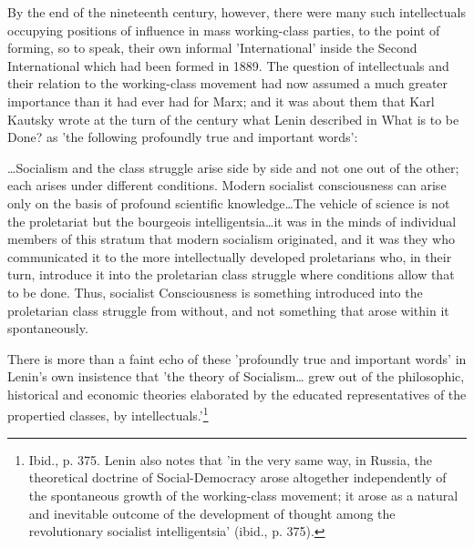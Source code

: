 By the end of the nineteenth century, however, there were many such intellectuals occupying positions of influence in mass working-class parties, to the point of forming, so to speak, their own informal 'International' inside the Second International which had been formed in 1889. The question of intellectuals and their relation to the working-class movement had now assumed a much greater importance than it had ever had for Marx; and it was about them that Karl Kautsky wrote at the turn of the century what Lenin described in What is to be Done? as 'the following profoundly true and important words':
\begin{displayquote}
    \dots Socialism and the class struggle arise side by side and not one out of the other; each arises under different conditions. Modern socialist consciousness can arise only on the basis of profound scientific knowledge\dots The vehicle of science is not the proletariat but the bourgeois intelligentsia\dots it was in the minds of individual members of this stratum that modern socialism originated, and it was they who communicated it to the more intellectually developed proletarians who, in their turn, introduce it into the proletarian class struggle where conditions allow that to be done. Thus, socialist Consciousness is something introduced into the proletarian class struggle from without, and not something that arose within it spontaneously.
\end{displayquote}

There is more than a faint echo of these 'profoundly true and important words' in Lenin's own insistence that 'the theory of Socialism\dots{} grew out of the philosophic, historical and economic theories elaborated by the educated representatives of the propertied classes, by intellectuals.'\footnote{Ibid., p. 375. Lenin also notes that 'in the very same way, in Russia, the theoretical doctrine of Social-Democracy arose altogether independently of the spontaneous growth of the working-class movement; it arose as a natural and inevitable outcome of the development of thought among the revolutionary socialist intelligentsia' (ibid., p. 375).}

